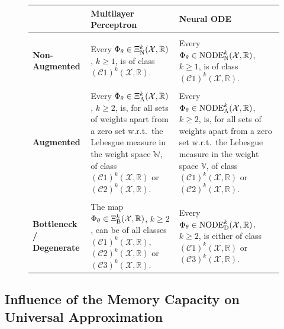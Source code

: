 \documentclass[10pt]{article}
\begin{document}
\begin{figure}
	\begin{tabular*}{\textwidth}{p{2.2cm}|p{6.0cm}|p{6.0cm}}
		& \hspace{10mm}\textbf{Multilayer Perceptron} & \hspace{17mm} \textbf{Neural ODE} \\[3pt]
		\hline && \\[-5pt]
		\textbf{Non-Augmented}
		&
		Every $\Phi_\theta \in \Xi^k_\textup{N}(\mathcal{X},\mathbb{R})$, $k\geq 1$, is of class $(\mathcal{C}1)^k(\mathcal{X},\mathbb{R})$.
		& 
		Every $\Phi_\theta \in \textup{NODE}^k_\textup{N}(\mathcal{X},\mathbb{R})$, $k\geq 1$, is of class $(\mathcal{C}1)^k(\mathcal{X},\mathbb{R})$. \\[5pt]
		\hline && \\[-5pt]
		\textbf{Augmented}
		&
		Every $\Phi_\theta \in \Xi^k_\textup{A}(\mathcal{X},\mathbb{R})$, $k \geq 2$, is, for all sets of weights apart from a zero set w.r.t.\ the Lebesgue measure in the weight space $\mathbb{W}$, of class $(\mathcal{C}1)^k(\mathcal{X},\mathbb{R})$ or $(\mathcal{C}2)^k(\mathcal{X},\mathbb{R})$. 
		& 
		Every $\Phi_\theta\in \textup{NODE}^k_\textup{A}(\mathcal{X},\mathbb{R})$, $k \geq 2$, is, for all sets of weights apart from a zero set w.r.t.\ the Lebesgue measure in the weight space $\mathbb{V}$, of class $(\mathcal{C}1)^k(\mathcal{X},\mathbb{R})$ or $(\mathcal{C}2)^k(\mathcal{X},\mathbb{R})$. \\[5pt]
		\hline && \\[-5pt]
		\textbf{Bottleneck / Degenerate} 
		&
		The map $\Phi_\theta \in \Xi^k_\textup{B}(\mathcal{X},\mathbb{R})$, $k\geq 2$, can be of all classes $(\mathcal{C}1)^k(\mathcal{X},\mathbb{R})$, $(\mathcal{C}2)^k(\mathcal{X},\mathbb{R})$ or $(\mathcal{C}3)^k(\mathcal{X},\mathbb{R})$. 
		& 
		Every $\Phi_\theta \in \textup{NODE}^k_\textup{D}(\mathcal{X},\mathbb{R})$, \mbox{$k\geq 2$,} is either of class $(\mathcal{C}1)^k(\mathcal{X},\mathbb{R})$ or $(\mathcal{C}3)^k(\mathcal{X},\mathbb{R})$.
	\end{tabular*}
	\vspace{3mm}
	 \label{cekk_tab:results}
\end{figure}



\subsection{Influence of the Memory Capacity on Universal Approximation}
\label{cekk_sec:delay}
\end{document}
